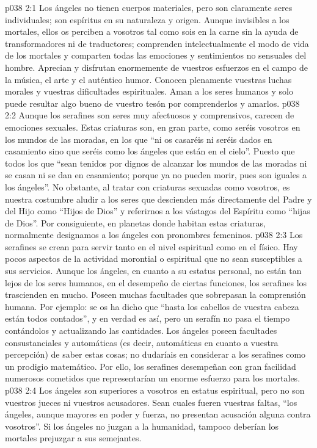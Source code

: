 \vs p038 2:1 Los ángeles no tienen cuerpos materiales, pero son claramente seres individuales; son espíritus en su naturaleza y origen. Aunque invisibles a los mortales, ellos os perciben a vosotros tal como sois en la carne sin la ayuda de transformadores ni de traductores; comprenden intelectualmente el modo de vida de los mortales y comparten todas las emociones y sentimientos no sensuales del hombre. Aprecian y disfrutan enormemente de vuestros esfuerzos en el campo de la música, el arte y el auténtico humor. Conocen plenamente vuestras luchas morales y vuestras dificultades espirituales. Aman a los seres humanos y solo puede resultar algo bueno de vuestro tesón por comprenderlos y amarlos.
\vs p038 2:2 \pc Aunque los serafines son seres muy afectuosos y comprensivos, carecen de emociones sexuales. Estas criaturas son, en gran parte, como seréis vosotros en los mundos de las moradas, en los que “ni os casaréis ni seréis dados en casamiento sino que seréis como los ángeles que están en el cielo”. Puesto que todos los que “sean tenidos por dignos de alcanzar los mundos de las moradas ni se casan ni se dan en casamiento; porque ya no pueden morir, pues son iguales a los ángeles”. No obstante, al tratar con criaturas sexuadas como vosotros, es nuestra costumbre aludir a los seres que descienden más directamente del Padre y del Hijo como “Hijos de Dios” y referirnos a los vástagos del Espíritu como “hijas de Dios”. Por consiguiente, en planetas donde habitan estas criaturas, normalmente designamos a los ángeles con pronombres femeninos.
\vs p038 2:3 Los serafines se crean para servir tanto en el nivel espiritual como en el físico. Hay pocos aspectos de la actividad morontial o espiritual que no sean susceptibles a sus servicios. Aunque los ángeles, en cuanto a su estatus personal, no están tan lejos de los seres humanos, en el desempeño de ciertas funciones, los serafines los trascienden en mucho. Poseen muchas facultades que sobrepasan la comprensión humana. Por ejemplo: se os ha dicho que “hasta los cabellos de vuestra cabeza están todos contados”, y en verdad es así, pero un serafín no pasa el tiempo contándolos y actualizando las cantidades. Los ángeles poseen facultades consustanciales y automáticas (es decir, automáticas en cuanto a vuestra percepción) de saber estas cosas; no dudaríais en considerar a los serafines como un prodigio matemático. Por ello, los serafines desempeñan con gran facilidad numerosos cometidos que representarían un enorme esfuerzo para los mortales.
\vs p038 2:4 \pc Los ángeles son superiores a vosotros en estatus espiritual, pero no son vuestros jueces ni vuestros acusadores. Sean cuales fueren vuestras faltas, “los ángeles, aunque mayores en poder y fuerza, no presentan acusación alguna contra vosotros”. Si los ángeles no juzgan a la humanidad, tampoco deberían los mortales prejuzgar a sus semejantes.
